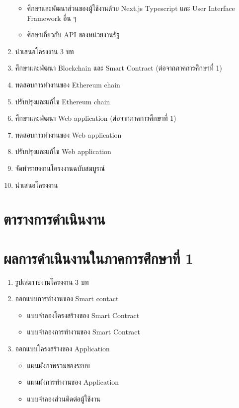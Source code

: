 \documentclass[12pt,oneside,openright,a4paper]{cpe-thai-project}
\begin{document}
\begin{enumerate}
	\begin{itemize}
		\item ศึกษาและพัฒนาส่วนของผู้ใช้งานด้วย Next.js Typescript และ User Interface Framework อื่น ๆ 
		\item ศึกษาเกี่ยวกับ API ของหน่วยงานรัฐ
	\end{itemize}
\item นำเสนอโครงงาน 3 บท
\item ศึกษาและพัฒนา Blockchain และ Smart Contract (ต่อจากภาคการศึกษาที่ 1)
\item ทดสอบการทำงานของ Ethereum chain
\item ปรับปรุงและแก้ไข Ethereum chain
\item ศึกษาและพัฒนา Web application (ต่อจากภาคการศึกษาที่ 1)
\item ทดสอบการทำงานของ Web application
\item ปรับปรุงและแก้ไข Web application
\item จัดทำรายงงานโครงงานฉบับสมบูรณ์
\item นำเสนอโครงงาน
\end{enumerate}

\section{ตารางการดำเนินงาน}

\section{ผลการดำเนินงานในภาคการศึกษาที่ 1}
\begin{enumerate}
\item รูปเล่มรายงานโครงงาน 3 บท
\item ออกแบบการทำงานของ Smart contact
	\begin{itemize}
		\item แบบจำลองโครงสร้างของ Smart Contract
		\item แบบจำลองการทำงานของ Smart Contract
	\end{itemize}
\item ออกแบบโครงสร้างของ Application
	\begin{itemize}
		\item แผนผังภาพรวมของระบบ
		\item แผนผังการทำงานของ Application
		\item แบบจำลองส่วนติดต่อผู้ใช้งาน
	\end{itemize}
\end{enumerate}
\end{document}
